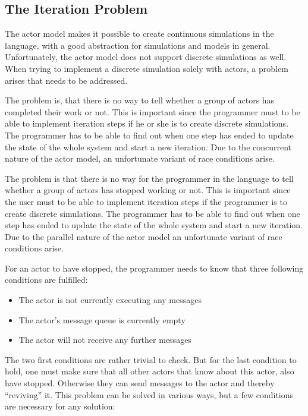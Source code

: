\subsection{The Iteration Problem}

The actor model makes it possible to create continuous simulations in the language, with a good abstraction for simulations and models in general. Unfortunately, the actor model does not support discrete simulations as well. When trying to implement a discrete simulation solely with actors, a problem arises that needs to be addressed.

The problem is, that there is no way to tell whether a group of actors has completed their work or not. This is important since the programmer must to be able to implement iteration steps if he or she is to create discrete simulations. The programmer has to be able to find out when one step has ended to update the state of the whole system and start a new iteration. Due to the concurrent nature of the actor model, an unfortunate variant of race conditions arise.

The problem is that there is no way for the programmer in the language to tell whether a group of actors has stopped working or not. This is important since the user must to be able to implement iteration steps if the programmer is to create discrete simulations. The programmer has to be able to find out when one step has ended to update the state of the whole system and start a new iteration. Due to the parallel nature of the actor model an unfortunate variant of race conditions arise.

For an actor to have stopped, the programmer needs to know that three following conditions are fulfilled:
\begin{itemize}
\item The actor is not currently executing any messages
\item The actor's message queue is currently empty
\item The actor will not receive any further messages
\end{itemize} 

The two first conditions are rather trivial to check. But for the last condition to hold, one must make sure that all other actors that know about this actor, also have stopped. Otherwise they can send messages to the actor and thereby \enquote{reviving} it. This problem can be solved in various ways, but a few conditions are necessary for any solution:

